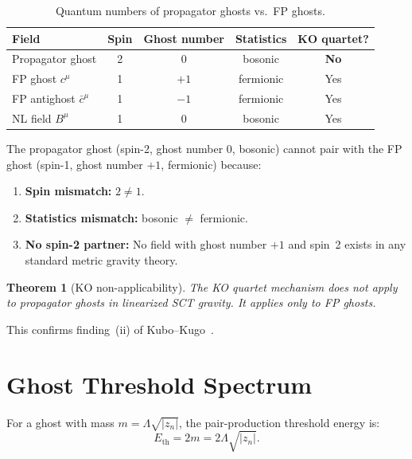 \documentclass[11pt,a4paper]{article}
\newtheorem{theorem}{Theorem}[section]
\begin{document}
\begin{table}[htb]
\centering
\caption{Quantum numbers of propagator ghosts vs.\ FP ghosts.}
\label{tab:quantum-numbers}
\begin{tabular}{lcccc}
\toprule
Field & Spin & Ghost number & Statistics & KO quartet? \\
\midrule
Propagator ghost & 2 & 0 & bosonic & \textbf{No} \\
FP ghost $c^\mu$ & 1 & $+1$ & fermionic & Yes \\
FP antighost $\bar{c}^\mu$ & 1 & $-1$ & fermionic & Yes \\
NL field $B^\mu$ & 1 & 0 & bosonic & Yes \\
\bottomrule
\end{tabular}
\end{table}

The propagator ghost (spin-2, ghost number 0, bosonic) cannot pair with
the FP ghost (spin-1, ghost number $+1$, fermionic) because:
\begin{enumerate}[(1)]
  \item \textbf{Spin mismatch:} $2 \neq 1$.
  \item \textbf{Statistics mismatch:} bosonic $\neq$ fermionic.
  \item \textbf{No spin-2 partner:} No field with ghost number $+1$ and
    spin~2 exists in any standard metric gravity theory.
\end{enumerate}

\begin{theorem}[KO non-applicability]
  The KO quartet mechanism does \emph{not} apply to propagator ghosts
  in linearized SCT gravity.  It applies only to FP ghosts.
\end{theorem}

This confirms finding~(ii) of Kubo--Kugo~\cite{KuboKugo2023}.


\section{Ghost Threshold Spectrum}
\label{sec:thresholds}

For a ghost with mass $m = \Lambda\sqrt{|z_n|}$, the pair-production
threshold energy is:
\begin{equation}\label{eq:threshold}
  E_{\text{th}} = 2m = 2\Lambda\sqrt{|z_n|}.
\end{equation}
\end{document}
